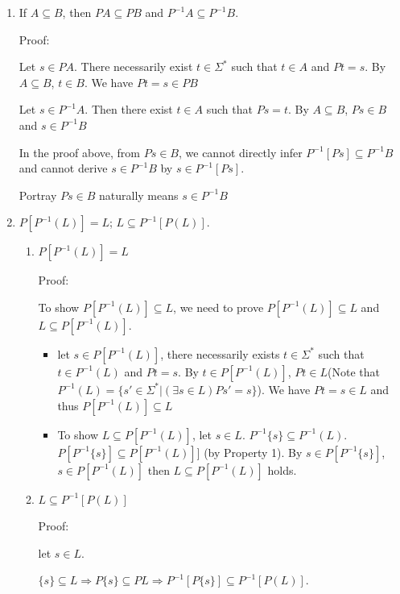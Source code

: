\documentclass{article}
\begin{document}
\begin{enumerate}
  \item If $A \subseteq B$, then $PA \subseteq PB$ and $P^{-1}A \subseteq P^{-1}B$.
  
  Proof:

  Let $s \in PA$. There necessarily exist $t \in \Sigma^*$ such that $t \in A$ and $Pt = s$. By $A \subseteq B$, $t \in B$. We have $Pt = s \in PB$
  
  Let $s \in P^{-1}A$. Then there exist $t \in A$ such that $Ps = t$. By $A \subseteq B$, $Ps \in B$ and $s\in P^{-1}B$

  In the proof above, from $Ps \in B$, we cannot directly infer $P^{-1}[Ps] \subseteq P^{-1}B$ and cannot derive $s \in P^{-1}B$ by $s \in P^{-1}[Ps]$.

  Portray $Ps \in B$ naturally means $s \in P^{-1}B$

  \item $P[P^{-1}(L)] = L$; $L \subseteq P^{-1}[P(L)]$.
  

  \begin{enumerate}
    \item $P[P^{-1}(L)] = L$
    
    Proof:

    To show $P[P^{-1}(L)] \subseteq L$, we need to prove $P[P^{-1}(L)] \subseteq L$ and $L \subseteq P[P^{-1}(L)]$.
  
    \begin{itemize}
      \item let $s \in P[P^{-1}(L)]$, there necessarily exists $t \in \Sigma^*$ such that $t \in P^{-1}(L)$ and $Pt = s$. By $t \in P[P^{-1}(L)]$, $Pt \in L$(Note that $P^{-1}(L) = \{s\prime \in \Sigma^* | (\exists s \in L)Ps\prime = s\}$). We have $Pt = s \in L$ and thus $P[P^{-1}(L)] \subseteq L$
      \item To show $L \subseteq P[P^{-1}(L)]$, let $s \in L$. $P^{-1}\{s\} \subseteq P^{-1}(L)$. $P[P^{-1}\{s\}] \subseteq P[P^{-1}(L)]]$ (by Property 1). By $s \in P[P^{-1}\{s\}]$, $s \in P[P^{-1}(L)]$ then $L \subseteq P[P^{-1}(L)]$ holds.
    \end{itemize}
      
    \item $L \subseteq P^{-1}[P(L)]$
    
    Proof:

    let $s \in L$. 

    $\{s\} \subseteq L \Rightarrow P\{s\} \subseteq PL \Rightarrow P^{-1}[P\{s\}] \subseteq P^{-1}[P(L)]$.


\end{enumerate}
\end{enumerate}
\end{document}
